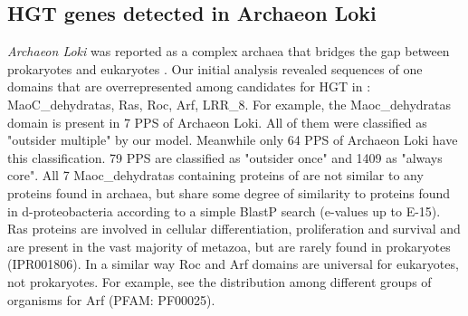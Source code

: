\subsection{HGT genes detected in Archaeon Loki}
\textit{Archaeon Loki} was reported as a complex archaea that bridges the gap
between prokaryotes and eukaryotes \cite{Spang2015}. Our initial analysis
revealed sequences of one domains that are overrepresented among candidates for
HGT in : MaoC\_dehydratas, Ras, Roc, Arf, LRR_8. For
example, the Maoc_dehydratas domain is present in 7 PPS of Archaeon Loki. All
of them were classified as "outsider multiple" by our model. Meanwhile only 64
PPS of Archaeon Loki have this classification. 79 PPS are classified as
"outsider once" and 1409 as "always core". All 7 Maoc\_dehydratas containing
proteins of  are not similar to any proteins found in
archaea, but share some degree of similarity to proteins found in
d-proteobacteria according to a simple BlastP search (e-values up to E-15).
Ras proteins are involved in cellular differentiation, proliferation and
survival and are present in the vast majority of metazoa, but are rarely found
in prokaryotes (IPR001806). In a similar way Roc and Arf domains are universal
for eukaryotes, not prokaryotes. For example, see the distribution among
different groups of organisms for Arf (PFAM: PF00025).
